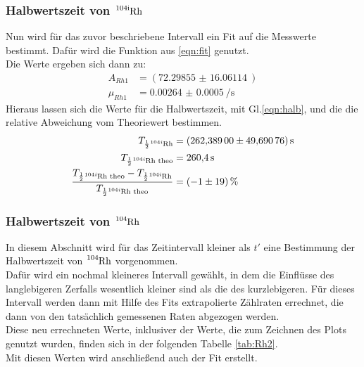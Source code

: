 \subsubsection{Halbwertszeit von $\ce{^{\text{104i}}_{}\text{Rh}}$}

\noindent
Nun wird für das zuvor beschriebene Intervall ein Fit auf die Messwerte bestimmt. 
Dafür wird die Funktion aus \ref{eqn:fit} genutzt.\\
Die Werte ergeben sich dann zu:
\begin{align*}
    A_{Rh1}&=(\SI{72.29855(1606114)}{})\\
    \mu_{Rh1}&=\SI{0.00264(000050)}{\per\second}
\end{align*}
Hieraus lassen sich die Werte für die Halbwertszeit, mit Gl.\ref{eqn:halb}, und die die relative Abweichung vom Theoriewert\cite{Rhodium} bestimmen.
\begin{align*}
    T_{\frac{1}{2}\ce{^{104i}_{}Rh}}&= \SI{262.38900(4969076)}{\second}\\
    T_{\frac{1}{2}\ce{^{104i}_{}Rh}\text{ theo}}&= \SI{260.4}{\second}\\
    \frac{T_{\frac{1}{2}\ce{^{104i}_{}Rh} \text{ theo}} - T_{\frac{1}{2}\ce{^{104i}_{}Rh}}}{T_{\frac{1}{2}\ce{^{104i}_{}Rh}\text{ theo}}}&=\SI{-01(19)}{\percent}
\end{align*}

\subsubsection{Halbwertszeit von $\ce{^{\text{104}}_{}\text{Rh}}$}

In diesem Abschnitt wird für das Zeitintervall kleiner als $t'$ eine Bestimmung der Halbwertszeit von $\ce{^{104}_{}Rh}$ vorgenommen.\\
Dafür wird ein nochmal kleineres Intervall gewählt, in dem die Einflüsse des langlebigeren Zerfalls wesentlich kleiner sind als die des kurzlebigeren.
Für dieses Intervall werden dann mit Hilfe des Fits extrapolierte Zählraten errechnet, die dann von den tatsächlich gemessenen Raten abgezogen werden.\\
Diese neu errechneten Werte, inklusiver der Werte, die zum Zeichnen des Plots genutzt wurden, finden sich in der folgenden Tabelle \ref{tab:Rh2}.\\
Mit diesen Werten wird anschließend auch der Fit erstellt.\\

